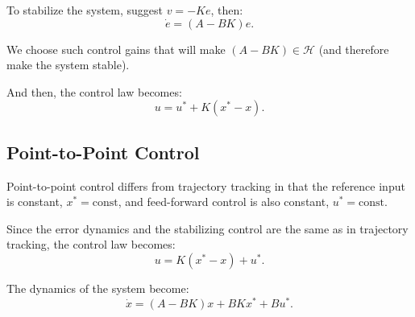 To stabilize the system, suggest \(v = -Ke\), then:
\[\dot{e} = (A - BK)e.\]

We choose such control gains that will make $(A-BK) \in \mathcal{H}$ (and therefore make the system stable).

And then, the control law becomes:
\[u = u^* + K(x^* - x).\]

\subsection{Point-to-Point Control}

Point-to-point control differs from trajectory tracking in that the reference input is constant, \(x^* = \text{const}\), and feed-forward control is also constant, \(u^* = \text{const}\).

Since the error dynamics and the stabilizing control are the same as in trajectory tracking, the control law becomes:
\[u = K(x^* - x) + u^*.\]

The dynamics of the system become:
\[\dot{x} = (A - BK)x + BKx^* + Bu^*.\]